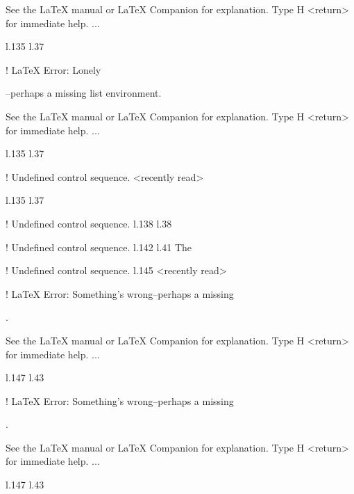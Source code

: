 {{{{{{See the LaTeX manual or LaTeX Companion for explanation.
Type  H <return>  for immediate help.
 ...                                              
                                                  
l.135 l.37     \item \xmlNode
                             

! LaTeX Error: Lonely \item--perhaps a missing list environment.

See the LaTeX manual or LaTeX Companion for explanation.
Type  H <return>  for immediate help.
 ...                                              
                                                  
l.135 l.37     \item \xmlNode
                             
! Undefined control sequence.
<recently read> \xmlNode 
                         
l.135 l.37     \item \xmlNode
                             
! Undefined control sequence.
l.138 l.38       \xmlNode
                         
! Undefined control sequence.
l.142 l.41       The \xmlNode
                             
! Undefined control sequence.
l.145 <recently read> \xmlNode
                              

! LaTeX Error: Something's wrong--perhaps a missing \item.

See the LaTeX manual or LaTeX Companion for explanation.
Type  H <return>  for immediate help.
 ...                                              
                                                  
l.147 l.43         \item \xmlNode
                                 

! LaTeX Error: Something's wrong--perhaps a missing \item.

See the LaTeX manual or LaTeX Companion for explanation.
Type  H <return>  for immediate help.
 ...                                              
                                                  
l.147 l.43         \item \xmlNode
                                 

}}}}}}
